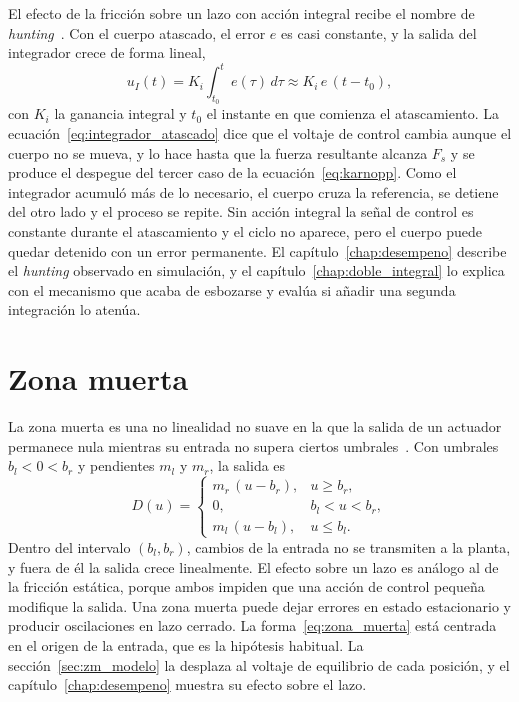El efecto de la fricción sobre un lazo con acción integral recibe el nombre de \emph{hunting}~\cite{olsson,armstrong}. Con el cuerpo atascado, el error $e$ es casi constante, y la salida del integrador crece de forma lineal,
\begin{equation}
u_I(t)=K_i\int_{t_0}^{t} e(\tau)\,d\tau \approx K_i\,e\,(t-t_0) ,
\label{eq:integrador_atascado}
\end{equation}
con $K_i$ la ganancia integral y $t_0$ el instante en que comienza el atascamiento. La ecuación~\eqref{eq:integrador_atascado} dice que el voltaje de control cambia aunque el cuerpo no se mueva, y lo hace hasta que la fuerza resultante alcanza $F_s$ y se produce el despegue del tercer caso de la ecuación~\eqref{eq:karnopp}. Como el integrador acumuló más de lo necesario, el cuerpo cruza la referencia, se detiene del otro lado y el proceso se repite. Sin acción integral la señal de control es constante durante el atascamiento y el ciclo no aparece, pero el cuerpo puede quedar detenido con un error permanente. El capítulo~\ref{chap:desempeno} describe el \emph{hunting} observado en simulación, y el capítulo~\ref{chap:doble_integral} lo explica con el mecanismo que acaba de esbozarse y evalúa si añadir una segunda integración lo atenúa.

\section{Zona muerta}\label{sec:fund_zona_muerta}

La zona muerta es una no linealidad no suave en la que la salida de un actuador permanece nula mientras su entrada no supera ciertos umbrales~\cite{gang}. Con umbrales $b_l<0<b_r$ y pendientes $m_l$ y $m_r$, la salida es
\begin{equation}
D(u)=
\begin{cases}
m_r\,(u-b_r), & u\ge b_r, \\
0, & b_l<u<b_r, \\
m_l\,(u-b_l), & u\le b_l .
\end{cases}
\label{eq:zona_muerta}
\end{equation}
Dentro del intervalo $(b_l,b_r)$, cambios de la entrada no se transmiten a la planta, y fuera de él la salida crece linealmente. El efecto sobre un lazo es análogo al de la fricción estática, porque ambos impiden que una acción de control pequeña modifique la salida. Una zona muerta puede dejar errores en estado estacionario y producir oscilaciones en lazo cerrado. La forma~\eqref{eq:zona_muerta} está centrada en el origen de la entrada, que es la hipótesis habitual. La sección~\ref{sec:zm_modelo} la desplaza al voltaje de equilibrio de cada posición, y el capítulo~\ref{chap:desempeno} muestra su efecto sobre el lazo.

